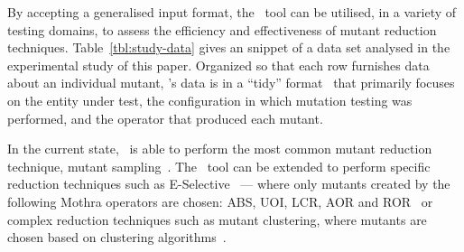 



By accepting a generalised input format, the \mr~tool can be utilised, in a variety of testing domains, to assess the
efficiency and effectiveness of mutant reduction techniques. Table~\ref{tbl:study-data} gives an snippet of a data set
analysed in the experimental study of this paper. Organized so that each row furnishes data about an individual mutant,
\mr's data is in a ``tidy'' format~\cite{Wickham2014} that primarily focuses on the entity under test, the configuration
in which mutation testing was performed, and the operator that produced each mutant.



In the current state, \mr~is able to perform the most common mutant reduction technique, mutant
sampling~\cite{gopinath2015mutation, jia2011analysis, gopinath2015empirical}.  The \mr~tool can be extended to perform
specific reduction techniques such as E-Selective~\cite{offutt1996experimental} --- where only mutants created by the
following Mothra operators are chosen: ABS, UOI, LCR, AOR and ROR~\cite{gopinath2015empirical} or complex reduction
techniques such as mutant clustering, where mutants are chosen based on clustering algorithms~\cite{jia2011analysis}.

